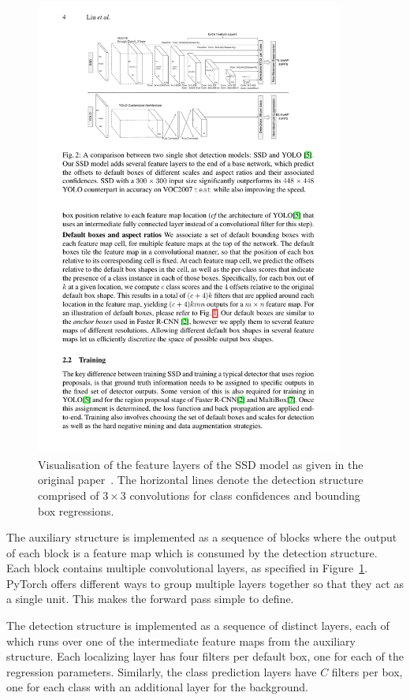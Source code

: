 \begin{figure}[htb]
  \centering
  \includegraphics[width=0.9\textwidth]{figs/SSD_model.pdf}
  \caption[SSD architecture]{Visualisation of the feature layers of the SSD model as given in the original paper~\parencite{liu_ssd_2016}.
The horizontal lines denote the detection structure comprised of \(3\times 3\) convolutions for class confidences and bounding box regressions.}\label{fig:model}
\end{figure}

The auxiliary structure is implemented as a sequence of blocks where the output of each block is a feature map which is consumed by the detection structure.
Each block contains multiple convolutional layers, as specified in Figure~\ref{fig:model}.
PyTorch offers different ways to group multiple layers together so that they act as a single unit.
This makes the forward pass simple to define.

The detection structure is implemented as a sequence of distinct layers, each of which runs over one of the intermediate feature maps from the auxiliary structure.
Each localizing layer has four filters per default box, one for each of the regression parameters.
Similarly, the class prediction layers have \(C\) filters per box, one for each class with an additional layer for the background.

